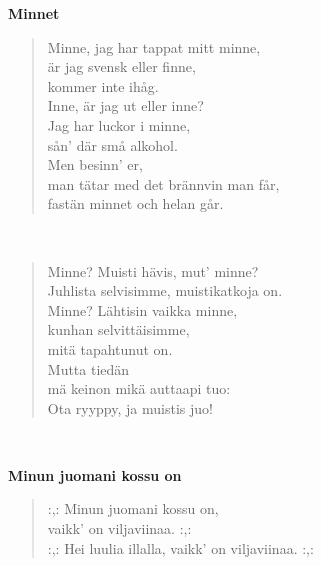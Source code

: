 %
%
\noindent\begin{minipage}{\linewidth}
\vspace{5pt}
\parbox[t]{0.85\linewidth}{\raggedright {\large\bf Minnet}\\[6pt]}
\begin{verse}
	Minne, jag har tappat mitt minne,\\
	är jag svensk eller finne,\\
	kommer inte ihåg.\\
	Inne, är jag ut eller inne?\\
	Jag har luckor i minne,\\
	sån' där små alkohol.\\
	Men besinn' er,\\
	man tätar med det brännvin man får,\\
	fastän minnet och helan går.\\
\end{verse}
\end{minipage}\\[10pt]
\noindent\begin{minipage}{\linewidth}
\begin{verse}
	Minne? Muisti hävis, mut' minne?\\
	Juhlista selvisimme, muistikatkoja on.\\
	Minne? Lähtisin vaikka minne,\\
	kunhan selvittäisimme,\\
	mitä tapahtunut on.\\
	Mutta tiedän\\
	mä keinon mikä auttaapi tuo:\\
	Ota ryyppy, ja muistis juo!\\
\end{verse}
\end{minipage}\\[10pt]
%
%
\noindent\begin{minipage}{\linewidth}
\vspace{5pt}
\parbox[t]{0.85\linewidth}{\raggedright {\large\bf Minun juomani kossu on}\\[6pt]}
\begin{verse}
	\hspace{0pt-\widthof{:,: }}:,: Minun juomani kossu on,\\
	vaikk' on viljaviinaa. :,:\\
	\hspace{0pt-\widthof{:,: }}:,: Hei luulia illalla, vaikk' on viljaviinaa. :,:\\
\end{verse}
\end{minipage}\\[10pt]
